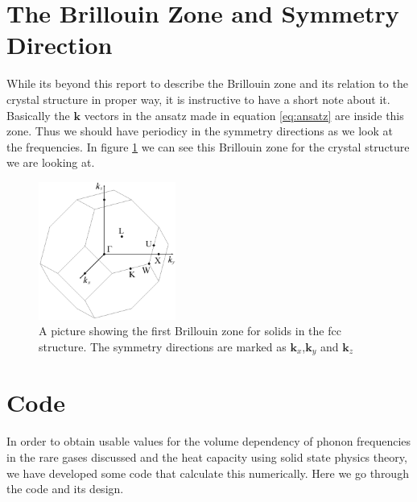 \documentclass[11pt]{article}
\begin{document}
\section{The Brillouin Zone and Symmetry Direction}
While its beyond this report to describe the Brillouin zone and its relation to the crystal structure in proper way, it is instructive to have a short note about it. Basically the $\mathbf{k}$ vectors in the ansatz made in equation \ref{eq:ansatz} are inside this zone. Thus we should have periodicy in the symmetry directions as we look at the frequencies. In figure \ref{fig:fccBrillouin} we can see this Brillouin zone for the crystal structure we are looking at. 
\begin{figure}[H]
	\centering
	\includegraphics[width=0.4\textwidth]{fccBrillouin.png}
	\caption{A picture showing the first Brillouin zone for solids in the fcc structure. The symmetry directions are marked as $\mathbf{k}_x$,$\mathbf{k}_y$ and $\mathbf{k}_z$ }
	\label{fig:fccBrillouin}
\end{figure}

\section{Code}
In order to obtain usable values for the volume dependency of phonon frequencies in the rare gases discussed and the heat capacity using solid state physics theory, we have developed some code that calculate this numerically. Here we go through the code and its design.
\end{document}
